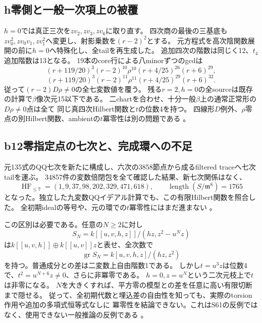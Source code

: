\documentclass[11pt,a4paper]{ltjsarticle}
\theoremstyle{remark}
\begin{document}
\subsection{h零側と一般一次項上の被覆}
$h=0$では真正三次を$zv_2,zv_3,zv_6$に取り直す。
四次商の最後の三基底も$zv_0^2,zv_0v_1,zv_1^2$へ変更し、射影乗数を$(r-2)^2$とする。
元方程式を高次陰関数展開の前に$h=0$へ特殊化し、全tailを再生成した。
追加四次の階数は同じく12、$t_4$追加階数は13となる。
19本のcore行による八minorずつのgcdは
\[
 (r+119/20)^3(r-2)^{10}\rho^{10}(r+4/25)^{26}(r+6)^{29},
\]
\[
 (r+119/20)^3(r-2)^{11}\rho^{11}(r+4/25)^{29}(r+6)^{32}.
\]
従って$(r-2)D\rho\ne0$の全七変数値を覆う。
残る$r=2,h=0$の全sourceは既存の計算で$\beta$像次元15以下である。
二chartを合わせ、十分一般$\beta$上の通常正常形の$D\rho\ne0$点は全て
同じ真四次Hilbert関数と$t$の位数4を持つ。
四線形$D$例外、$\rho$零点の別Hilbert関数、ambientの$t$冪零性は別の問題である
\cite{flag-zero8-cover-v50}。

\subsection{b12零指定点の七次と、完成環への不足}
元135式のQQ七次を新たに構成し、六次の3858節点から成るfiltered traceへ七次tailを運ぶ。
34857件の変数倍閉包を全て確認した結果、新七次関係はなく、
\[
 \operatorname{HF}_{\le7}=(1,9,37,98,202,329,471,618),\qquad
 \operatorname{length}(S/\mathfrak m^8)=1765
\]
となった。独立した九変数QQイデアル計算でも、この有限Hilbert関数を照合した。
全初期idealの等号や、元の環での$t$冪零性にはまだ進まない
\cite{flag-zero12-seven-v50}。

この区別は必要である。任意の$N\ge2$に対し
\[
 S_N=k[[u,v,h,z]]/(hz,z^2-u^Nz)
\]
は$k[[u,v,h]]\oplus k[[u,v]]z$と表せ、全次数で
\[
 \operatorname{gr}S_N=k[u,v,h,z]/(hz,z^2)
\]
を持つ。普通成分との差は二変数上自由階数1である。
しかし$t=u^3z$は位数4で、$t^2=u^{N+6}z\ne0$、さらに非冪零である。
$h=0,z=u^N$という二次元枝上で$t$は非零になる。
$N$を大きくすれば、平方零の模型との差を任意に高い有限切断まで隠せる。
従って、全初期代数と埋込差の自由性を知っても、実際のtorsion作用や追加の多項式恒等式なしに
冪零性を結論できない。これはS61の反例ではなく、使用できない一般推論の反例である
\cite{initial-nil-obstruction-v50}。
\end{document}
